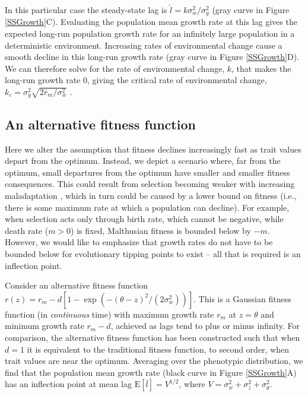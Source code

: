 \documentclass[12pt,letterpaper]{article} %
\begin{document}
In this particular case the steady-state lag is $\hat{l} = k \sigma_w^2/\sigma_g^2$ (gray curve in Figure \ref{SSGrowth}C).
Evaluating the population mean growth rate at this lag gives the expected long-run population growth rate for an infinitely large population in a deterministic environment.
Increasing rates of environmental change cause a smooth decline in this long-run growth rate (gray curve in Figure \ref{SSGrowth}D).
We can therefore solve for the rate of environmental change, $k$, that makes the long-run growth rate 0, giving the critical rate of environmental change, $k_c = \sigma_g^2 \sqrt{2\bar{r}_m/\sigma_w^2}$ \citep[][equation 11]{Lynch1993}.

\subsection*{An alternative fitness function}

Here we alter the assumption that fitness declines increasingly fast as trait values depart from the optimum. %
Instead, we depict a scenario where, far from the optimum, small departures from the optimum have smaller and smaller fitness consequences.
This could result from selection becoming weaker with increasing maladaptation \citep[for which there is some evidence;][]{Agrawal2010}, which in turn could be caused by a lower bound on fitness (i.e., there is some maximum rate at which a population can decline).
For example, when selection acts only through birth rate, which cannot be negative, while death rate ($m>0$) is fixed, Malthusian fitness is bounded below by $-m$.
However, we would like to emphasize that growth rates do not have to be bounded below for evolutionary tipping points to exist -- all that is required is an inflection point.

Consider an alternative fitness function $r(z) = r_m - d\left[1 - \exp\left(-(\theta-z)^2/(2\sigma_w^2)\right)\right]$.
This is a Gaussian fitness function (in \textit{continuous} time) with maximum growth rate $r_m$ at $z=\theta$ and minimum growth rate $r_m-d$, achieved as lags tend to plus or minus infinity.
For comparison, the alternative fitness function has been constructed such that when $d=1$ it is equivalent to the traditional fitness function, to second order, when trait values are near the optimum.
Averaging over the phenotypic distribution, we find that the population mean growth rate (black curve in Figure \ref{SSGrowth}A) has an inflection point at mean lag $\mathrm{E}[\bar{l}] = V^{1/2}$, where $V = \sigma_w^2 + \sigma_z^2 + \sigma_\theta^2$.
\end{document}
